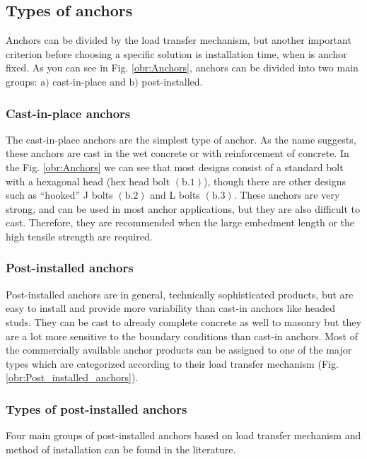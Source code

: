 \newpage
\subsection{Types of anchors}
\indent

Anchors can be divided by the load transfer mechanism, but another important criterion before choosing a specific solution is installation time, when is anchor fixed. As you can see in Fig. \ref{obr:Anchors}, anchors can be divided into two main groups: $\mathrm{a)}$ cast-in-place and $\mathrm{b)}$ post-installed. 


\subsubsection{Cast-in-place anchors}
The cast-in-place anchors are the simplest type of anchor. As the name suggests, these anchors are cast in the wet concrete or with reinforcement of concrete. In the Fig. \ref{obr:Anchors} we can see that most designs consist of a standard bolt with a hexagonal head (hex head bolt $\mathrm{(b.1)}$), though there are other designs such as “hooked” J bolts  $\mathrm{(b.2)}$ and L bolts $\mathrm{(b.3)}$. These anchors are very strong, and can be used in most anchor applications, but they are also difficult to cast. Therefore, they are recommended when the large embedment length or the  high tensile strength are required.

\subsubsection{Post-installed anchors}
Post-installed anchors are in general, technically sophisticated products, but are easy to install and provide more variability than cast-in anchors like headed studs. They can be cast to already complete concrete as well to masonry but they are a lot more sensitive to the boundary conditions than cast-in anchors. Most of the commercially available anchor products can be assigned to one of the major types which are categorized according to their load transfer mechanism (Fig. \ref{obr:Post_installed_anchors}).


\subsubsection{Types of post-installed anchors}
Four main groups of post-installed anchors based on load transfer mechanism and method of installation can be found in the literature.
 
